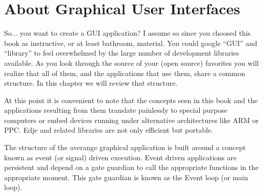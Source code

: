 \documentclass[12pt,a4paper,english]{book}
\begin{document}

\hypertarget{about-graphical-user-interfaces}{}
\chapter{About Graphical User Interfaces}

So... you want to create a GUI application? I assume so since you choosed this
book as instructive, or at least bathroom, material. You could google ``GUI'' and
``library'' to feel overwhelmed by the large number of development libraries
available. As you look through the source of your (open source) favorites you
will realize that all of them, and the applications that use them, share a
common structure. In this chapter we will review that structure.

At this point it is convenient to note that the concepts seen in this book and
the applications resulting from them translate painlessly to special purpose
computers or embed devices running under alternative architectures like ARM or
PPC. Edje and related libraries are not only efficient but portable.

The structure of the averange graphical application is built around a concept
known as event (or signal) driven execution. Event driven applications are
persistent and depend on a gate guardian to call the appropriate functions in
the appropriate moment. This gate guardian is known as the Event loop (or main
loop).

{\hfill{}\hfill}
\end{document}
